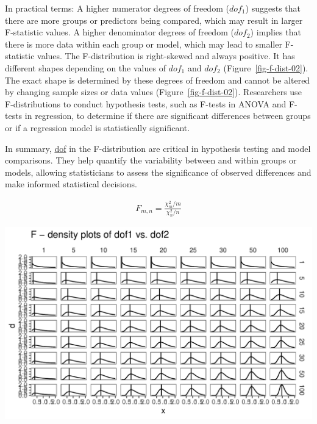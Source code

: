 \documentclass[
  a4paper,
]{scrbook}
\begin{document}
In practical terms: A higher numerator degrees of freedom (\(dof_1\))
suggests that there are more groups or predictors being compared, which
may result in larger F-statistic values. A higher denominator degrees of
freedom (\(dof_2\)) implies that there is more data within each group or
model, which may lead to smaller F-statistic values. The F-distribution
is right-skewed and always positive. It has different shapes depending
on the values of \(dof_1\) and \(dof_2\) (Figure~\ref{fig-f-dist-02}).
The exact shape is determined by these degrees of freedom and cannot be
altered by changing sample sizes or data values
(Figure~\ref{fig-f-dist-02}). Researchers use F-distributions to conduct
hypothesis tests, such as F-tests in ANOVA and F-tests in regression, to
determine if there are significant differences between groups or if a
regression model is statistically significant.

In summary, \hyperref[acronyms_dof]{dof} in the F-distribution are
critical in hypothesis testing and model comparisons. They help quantify
the variability between and within groups or models, allowing
statisticians to assess the significance of observed differences and
make informed statistical decisions.

\begin{align}
F_{m,n} = \frac{\chi^2_m/m}{\chi^2_n/n} \nonumber
\end{align}

\includegraphics[width=1\linewidth,height=\textheight,keepaspectratio]{chapter001_Distributions_files/figure-pdf/unnamed-chunk-9-1.pdf}
\end{document}
